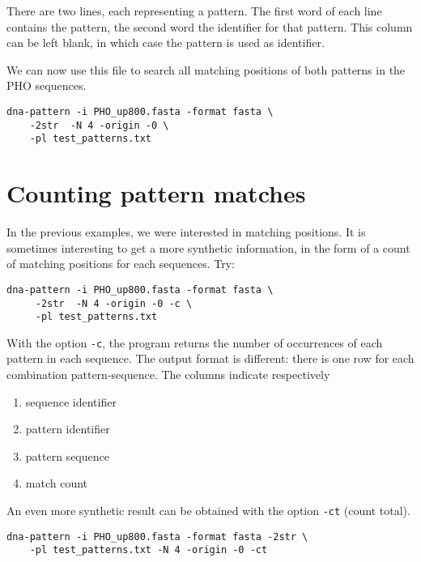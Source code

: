 There are two lines, each representing a pattern. The first word of
each line contains the pattern, the second word the identifier for
that pattern. This column can be left blank, in which case the pattern
is used as identifier.

We can now use this file to search all matching positions of both
patterns in the PHO sequences.

{\color{Blue} \begin{footnotesize} 
\begin{verbatim}
dna-pattern -i PHO_up800.fasta -format fasta \
    -2str  -N 4 -origin -0 \
    -pl test_patterns.txt
\end{verbatim} \end{footnotesize}
}

\section{Counting pattern matches}

In the previous examples, we were interested in matching positions. It
is sometimes interesting to get a more synthetic information, in the
form of a count of matching positions for each sequences. Try:

{\color{Blue} \begin{footnotesize} 
\begin{verbatim}
dna-pattern -i PHO_up800.fasta -format fasta \ 
     -2str  -N 4 -origin -0 -c \
     -pl test_patterns.txt
\end{verbatim} \end{footnotesize}
}

With the option \texttt{-c}, the program returns the number of
occurrences of each pattern in each sequence. The output format is
different: there is one row for each combination pattern-sequence. The
columns indicate respectively
\begin{enumerate}
\item sequence identifier
\item pattern identifier
\item pattern sequence
\item match count
\end{enumerate}

An even more synthetic result can be obtained with the option
\texttt{-ct} (count total).

{\color{Blue} \begin{footnotesize} 
\begin{verbatim}
dna-pattern -i PHO_up800.fasta -format fasta -2str \
    -pl test_patterns.txt -N 4 -origin -0 -ct
\end{verbatim} \end{footnotesize}
}

